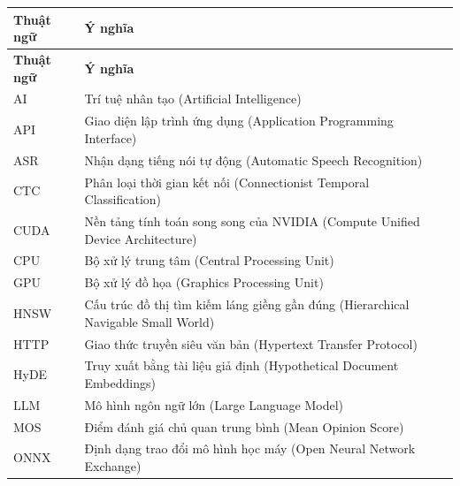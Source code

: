\documentclass[a4paper,13pt,twoside]{report}
\begin{document}
\begingroup
\small
\renewcommand{\arraystretch}{1.25}
\setlength{\LTleft}{0pt}
\setlength{\LTright}{0pt}
\begin{longtable}{|p{2.6cm}|p{11.2cm}|}
    \hline
    \textbf{Thuật ngữ} & \textbf{Ý nghĩa}                                                                  \\
    \hline
    \endfirsthead
    \hline
    \textbf{Thuật ngữ} & \textbf{Ý nghĩa}                                                                  \\
    \hline
    \endhead
    AI                 & Trí tuệ nhân tạo (Artificial Intelligence)                                        \\
    \hline
    API                & Giao diện lập trình ứng dụng (Application Programming Interface)                  \\
    \hline
    ASR                & Nhận dạng tiếng nói tự động (Automatic Speech Recognition)                        \\
    \hline
    CTC                & Phân loại thời gian kết nối (Connectionist Temporal Classification)               \\
    \hline
    CUDA               & Nền tảng tính toán song song của NVIDIA (Compute Unified Device Architecture)     \\
    \hline
    CPU                & Bộ xử lý trung tâm (Central Processing Unit)                                      \\
    \hline
    GPU                & Bộ xử lý đồ họa (Graphics Processing Unit)                                        \\
    \hline
    HNSW               & Cấu trúc đồ thị tìm kiếm láng giềng gần đúng (Hierarchical Navigable Small World) \\
    \hline
    HTTP               & Giao thức truyền siêu văn bản (Hypertext Transfer Protocol)                       \\
    \hline
    HyDE               & Truy xuất bằng tài liệu giả định (Hypothetical Document Embeddings)               \\
    \hline
    LLM                & Mô hình ngôn ngữ lớn (Large Language Model)                                       \\
    \hline
    MOS                & Điểm đánh giá chủ quan trung bình (Mean Opinion Score)                            \\
    \hline
    ONNX               & Định dạng trao đổi mô hình học máy (Open Neural Network Exchange)                 \\

\end{longtable}
\end{document}
